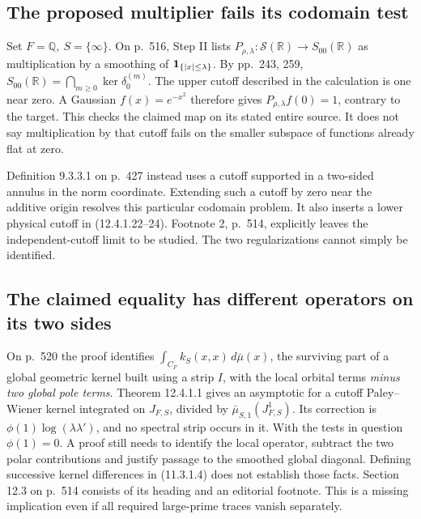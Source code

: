 \documentclass[11pt,reqno]{amsart}
\numberwithin{equation}{section}
\newcommand{\Q}{\mathbb Q}\newcommand{\R}{\mathbb R}\newcommand{\C}{\mathbb C}\newcommand{\Z}{\mathbb Z}
\begin{document}
\subsection*{The proposed multiplier fails its codomain test}
Set \(F=\Q,\ S=\{\infty\}\). On p.~516, Step II lists \(P_{\rho,\lambda}:\mathcal S(\R)\to S_{00}(\R)\) as multiplication by a smoothing of \(\mathbf1_{\{|x|\le\lambda\}}\). By pp.~243, 259, \(S_{00}(\R)=\bigcap_{m\ge0}\ker\delta_0^{(m)}\). The upper cutoff described in the calculation is one near zero. A Gaussian \(f(x)=e^{-x^2}\) therefore gives \(P_{\rho,\lambda}f(0)=1\), contrary to the target. This checks the claimed map on its stated entire source. It does not say multiplication by that cutoff fails on the smaller subspace of functions already flat at zero.

Definition 9.3.3.1 on p.~427 instead uses a cutoff supported in a two-sided annulus in the norm coordinate. Extending such a cutoff by zero near the additive origin resolves this particular codomain problem. It also inserts a lower physical cutoff in (12.4.1.22--24). Footnote 2, p.~514, explicitly leaves the independent-cutoff limit to be studied. The two regularizations cannot simply be identified.

\subsection*{The claimed equality has different operators on its two sides}
On p.~520 the proof identifies \(\int_{C_F} k_S(x,x)\,d\bar\mu(x)\), the surviving part of a global geometric kernel built using a strip \(I\), with the local orbital terms \emph{minus two global pole terms}. Theorem 12.4.1.1 gives an asymptotic for a cutoff Paley--Wiener kernel integrated on \(J_{F,S}\), divided by \(\bar\mu_{S,1}(J_{F,S}^1)\). Its correction is \(\phi(1)\log(\lambda\lambda')\), and no spectral strip occurs in it. With the tests in question \(\phi(1)=0\). A proof still needs to identify the local operator, subtract the two polar contributions and justify passage to the smoothed global diagonal. Defining successive kernel differences in (11.3.1.4) does not establish those facts. Section 12.3 on p.~514 consists of its heading and an editorial footnote. This is a missing implication even if all required large-prime traces vanish separately.
\end{document}
